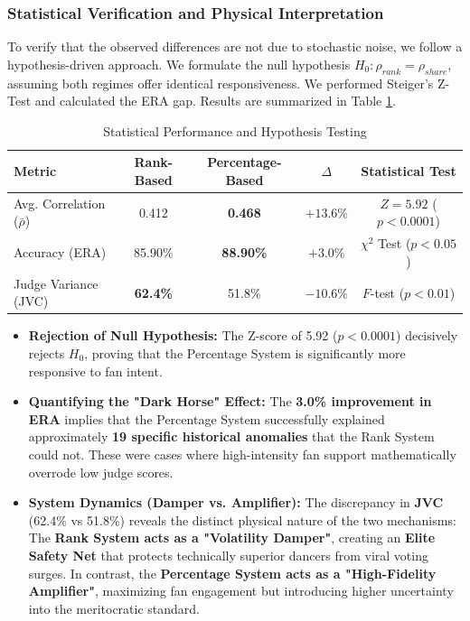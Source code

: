 \documentclass{mcmthesis}
\begin{document}
\subsubsection{Statistical Verification and Physical Interpretation}
To verify that the observed differences are not due to stochastic noise, we follow a hypothesis-driven approach. We formulate the null hypothesis $H_0: \rho_{rank} = \rho_{share}$, assuming both regimes offer identical responsiveness. We performed Steiger's Z-Test and calculated the ERA gap. Results are summarized in Table \ref{tab:stat_comparison}.
\vspace{-0.3cm}
\begin{table}[h]
	\centering
	\caption{Statistical Performance and Hypothesis Testing}
	\begin{tabular}{lcccc}
		\toprule
		\textbf{Metric} & \textbf{Rank-Based} & \textbf{Percentage-Based} & \textbf{$\Delta$} & \textbf{Statistical Test} \\
		\midrule
		Avg. Correlation ($\bar{\rho}$) & 0.412 & \textbf{0.468} & $+13.6\%$ & $Z=5.92$ ($p < 0.0001$) \\
		Accuracy (ERA) & 85.90\% & \textbf{88.90\%} & $+3.0\%$ & $\chi^2$ Test ($p < 0.05$) \\
		Judge Variance (JVC) & \textbf{62.4\%} & 51.8\% & $-10.6\%$ & $F$-test ($p < 0.01$) \\
		\bottomrule
	\end{tabular}
	\label{tab:stat_comparison}
\end{table}
\vspace{-0.6cm}
\begin{itemize}
	\setlength{\itemsep}{2pt}
	\setlength{\parskip}{0pt}
	\setlength{\parsep}{0pt}
	\setlength{\topsep}{2pt}
	\item \textbf{Rejection of Null Hypothesis:} The Z-score of 5.92 ($p < 0.0001$) decisively rejects $H_0$, proving that the Percentage System is significantly more responsive to fan intent.
	\item \textbf{Quantifying the "Dark Horse" Effect:} The \textbf{3.0\% improvement in ERA} implies that the Percentage System successfully explained approximately \textbf{19 specific historical anomalies} that the Rank System could not. These were cases where high-intensity fan support mathematically overrode low judge scores.
	\item \textbf{System Dynamics (Damper vs. Amplifier):} The discrepancy in \textbf{JVC} (62.4\% vs 51.8\%) reveals the distinct physical nature of the two mechanisms: The \textbf{Rank System acts as a "Volatility Damper"}, creating an \textbf{Elite Safety Net} that protects technically superior dancers from viral voting surges. In contrast, the \textbf{Percentage System acts as a "High-Fidelity Amplifier"}, maximizing fan engagement but introducing higher uncertainty into the meritocratic standard.
\end{itemize}
\end{document}
